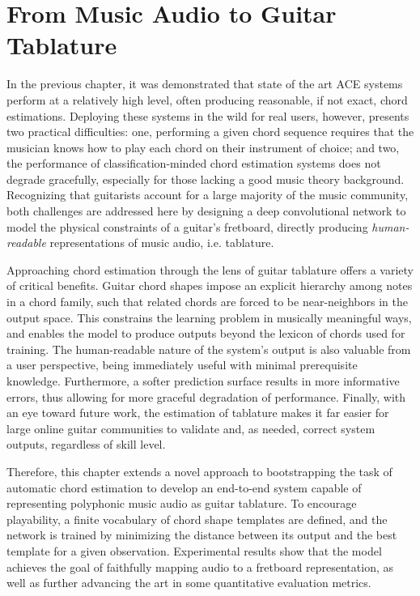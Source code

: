 


\graphicspath{{6/figures/}}

\chapter{From Music Audio to Guitar Tablature}
\label{chp:guitar}

In the previous chapter, it was demonstrated that state of the art ACE systems perform at a relatively high level, often producing reasonable, if not exact, chord estimations.
Deploying these systems in the wild for real users, however, presents two practical difficulties:
one, performing a given chord sequence requires that the musician knows how to play each chord on their instrument of choice;
and two, the performance of classification-minded chord estimation systems does not degrade gracefully, especially for those lacking a good music theory background.
Recognizing that guitarists account for a large majority of the music community, both challenges are addressed here by designing a deep convolutional network to model the physical constraints of a guitar's fretboard, directly producing \emph{human-readable} representations of music audio, i.e. tablature.

Approaching chord estimation through the lens of guitar tablature offers a variety of critical benefits.
Guitar chord shapes impose an explicit hierarchy among notes in a chord family, such that related chords are forced to be near-neighbors in the output space.
This constrains the learning problem in musically meaningful ways, and enables the model to produce outputs beyond the lexicon of chords used for training.
The human-readable nature of the system's output is also valuable from a user perspective, being immediately useful with minimal prerequisite knowledge.
Furthermore, a softer prediction surface results in more informative errors, thus allowing for more graceful degradation of performance.
Finally, with an eye toward future work, the estimation of tablature makes it far easier for large online guitar communities to validate and, as needed, correct system outputs, regardless of skill level.

Therefore, this chapter extends a novel approach to bootstrapping the task of automatic chord estimation to develop an end-to-end system capable of representing polyphonic music audio as guitar tablature.
To encourage playability, a finite vocabulary of chord shape templates are defined, and the network is trained by minimizing the distance between its output and the best template for a given observation.
Experimental results show that the model achieves the goal of faithfully mapping audio to a fretboard representation, as well as further advancing the art in some quantitative evaluation metrics.


